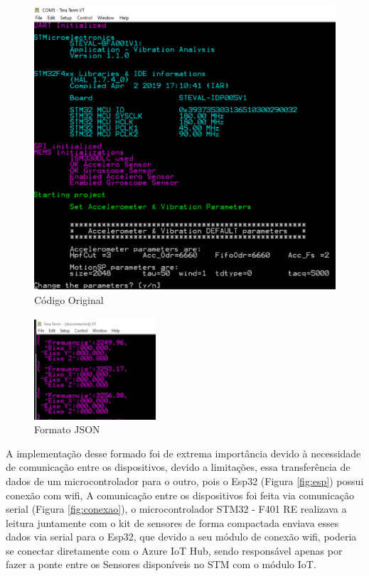 \documentclass[
	article,			%
	12pt,				%
	oneside,			%
	a4paper,			%
	section=TITLE,		%
	subsection=TITLE,	%
	english,			%
	brazil,				%
	sumario=tradicional
	]{abntex2}
\begin{document}
\begin{figure}[H]
    \centering
    \includegraphics[scale=0.5]{antes.PNG}
    \caption{Código Original}
    \label{fig: antes}
\end{figure}

\begin{figure}[H]
    \centering
    \includegraphics[scale=1.5]{depois.PNG}
    \caption{Formato JSON}
    \label{fig:json}
\end{figure}
A implementação desse formado foi de extrema importância devido à necessidade de comunicação entre os dispositivos, devido a limitações, essa transferência de dados de um microcontrolador para o outro, pois o Esp32 (Figura \ref{fig:esp}) possui conexão com wifi, A comunicação entre os dispositivos foi feita via comunicação serial (Figura \ref{fig:conexao}), o microcontrolador STM32 - F401 RE realizava a leitura juntamente com o kit de sensores de forma compactada enviava esses dados  via serial para o Esp32, que devido a seu módulo de conexão wifi, poderia se conectar diretamente com o Azure IoT Hub, sendo responsável apenas por fazer a ponte entre os Sensores disponíveis no STM com o módulo IoT. 
\end{document}
